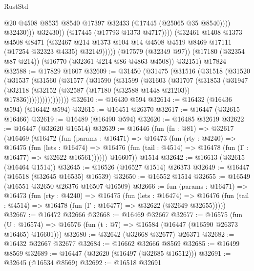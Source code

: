 \begin{lexlean}{RustStd}
\begin{coremodule}
{\begin{coremodule}
{{{{{{{{{{{{{{{{{{{{{{{{{{{{{{{{{{{{{{{{{{{{{{{{{{{{{{{                              @20
                              @4508
                              @8535
                              @8540
                              @17397
                              @32433
                              (@17445 (@25065 @35 @8540))))
                          @32430)))
                    @32430))
                (@17445 (@17793 @1373 @4717))))
            (@32461
              @1408
              @1373
              @4508
              @8471
              (@32467 @214 @1373 @104 @14 @4508 @4519 @8469 @17111 (@17254 @32323 @4335) @32149)))))
      (@17579 (@32349 @97))
      (@17180 (@32354 @87 @214))
      (@16770 (@32361 @214 @86 @4863 @4508))
      @32151)
    @17824
@32588 := @17829 @1607
@32609 := @31450
    (@31475
      (@31516
        (@31518
          (@31520
            (@31537
              (@31560
                (@31577
                  (@31590
                    (@31599
                      (@31603
                        (@31707
                          (@31853
                            (@31947
                              (@32118
                                (@32152
                                  (@32587 (@17180 (@32588 @1448 @21203)) @17836))))))))))))))))
@32610 := @16430 @594
@32614 := @16432 (@16436 @594) (@16442 @594)
@32615 := @16451 @26370
@32617 := @16447 (@32615 @16466)
@32619 := @16489 (@16490 @594)
@32620 := @16485 @32619
@32622 := @16447 (@32620 @16514)
@32639 := @16446
    (fun (fn : @81) =>
    @32617
      (@16469
        (@16472
          (fun (params : @16471) =>
          @16473
            (fun (rty : @4240) =>
            @16475
              (fun (lets : @16474) =>
              @16476 (fun (tail : @4514) => @16478 (fun (Γ : @16477) => @32622 @16561))))))
        @16607))
    @1514
@32642 := @16613 (@32615 (@16464 @1514))
@32645 := @16526 (@16527 @1514) @26373
@32649 := @16447 (@16518 (@32645 @16535) @16539)
@32650 := @16552 @1514
@32655 := @16549 (@16551 @32650 @26376 @16507 @16509)
@32666 := fun (params : @16471) =>
  @16473
    (fun (rty : @4240) =>
    @16475
      (fun (lets : @16474) =>
      @16476 (fun (tail : @4514) => @16478 (fun (Γ : @16477) => @32622 (@32649 @32655)))))
@32667 := @16472 @32666
@32668 := @16469 @32667
@32677 := @16575
    (fun (U : @16574) => @16576 (fun (t : @7) => @16584 (@16447 (@16590 @26373 @16465) @16601)))
@32680 := @32642 (@32668 @32677) @26371
@32682 := @16432 @32667 @32677
@32684 := @16662 @32666 @8569
@32685 := @16499 @8569
@32689 := @16447 (@32620 (@16497 (@32685 @16512)))
@32691 := @32645 (@16534 @8569)
@32692 := @16518 @32691
}}}}}}}}}}}}}}}}}}}}}}}}}}}}}}}}}}}}}}}}}}}}}}}}}}}}}}}
\end{coremodule}}
\end{coremodule}
\end{lexlean}

